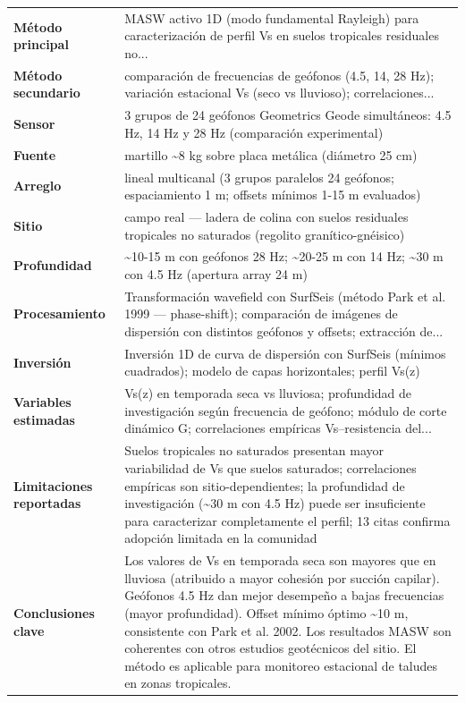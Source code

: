 \begin{center}\scriptsize
\begin{tabularx}{\textwidth}{@{}>{\bfseries}p{3.3cm} X@{}}
\toprule
M\'etodo principal & MASW activo 1D (modo fundamental Rayleigh) para caracterización de perfil Vs en suelos tropicales residuales no... \\
M\'etodo secundario & comparación de frecuencias de geófonos (4.5, 14, 28 Hz); variación estacional Vs (seco vs lluvioso); correlaciones... \\
Sensor & 3 grupos de 24 geófonos Geometrics Geode simultáneos: 4.5 Hz, 14 Hz y 28 Hz (comparación experimental) \\
Fuente & martillo \textasciitilde{}8 kg sobre placa metálica (diámetro 25 cm) \\
Arreglo & lineal multicanal (3 grupos paralelos 24 geófonos; espaciamiento 1 m; offsets mínimos 1-15 m evaluados) \\
Sitio & campo real --- ladera de colina con suelos residuales tropicales no saturados (regolito granítico-gnéisico) \\
Profundidad & \textasciitilde{}10-15 m con geófonos 28 Hz; \textasciitilde{}20-25 m con 14 Hz; \textasciitilde{}30 m con 4.5 Hz (apertura array 24 m) \\
Procesamiento & Transformación wavefield con SurfSeis (método Park et al. 1999 --- phase-shift); comparación de imágenes de dispersión con distintos geófonos y offsets; extracción de... \\
Inversi\'on & Inversión 1D de curva de dispersión con SurfSeis (mínimos cuadrados); modelo de capas horizontales; perfil Vs(z) \\
Variables estimadas & Vs(z) en temporada seca vs lluviosa; profundidad de investigación según frecuencia de geófono; módulo de corte dinámico G; correlaciones empíricas Vs--resistencia del... \\
Limitaciones reportadas & Suelos tropicales no saturados presentan mayor variabilidad de Vs que suelos saturados; correlaciones empíricas son sitio-dependientes; la profundidad de investigación (\textasciitilde{}30 m con 4.5 Hz) puede ser insuficiente para caracterizar completamente el perfil; 13 citas confirma adopción limitada en la comunidad \\
Conclusiones clave & Los valores de Vs en temporada seca son mayores que en lluviosa (atribuido a mayor cohesión por succión capilar). Geófonos 4.5 Hz dan mejor desempeño a bajas frecuencias (mayor profundidad). Offset mínimo óptimo \textasciitilde{}10 m, consistente con Park et al. 2002. Los resultados MASW son coherentes con otros estudios geotécnicos del sitio. El método es aplicable para monitoreo estacional de taludes en zonas tropicales. \\

\end{tabularx}
\end{center}
